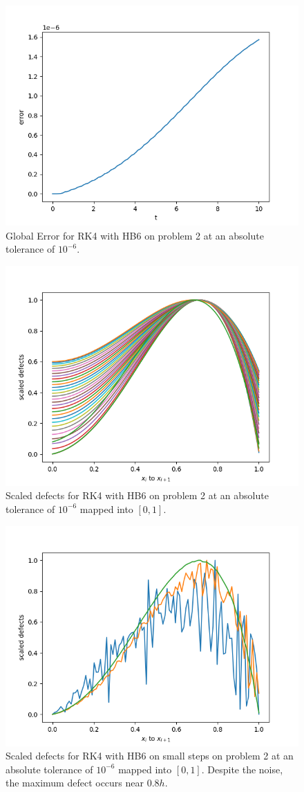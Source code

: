 \begin{figure}[H]
\centering
\includegraphics[width=0.7\linewidth]{./figures/rk4_with_hb6_p2_global_error}
\caption{Global Error for RK4 with HB6 on problem 2 at an absolute tolerance of $10^{-6}$.}
\label{fig:rk4_with_hb6_p2_global_error}
\end{figure}

\begin{figure}[H]
\centering
\includegraphics[width=0.7\linewidth]{./figures/rk4_with_hb6_p2_scaled_defects}
\caption{Scaled defects for RK4 with HB6 on problem 2 at an absolute tolerance of $10^{-6}$ mapped into $[0, 1]$.}
\label{fig:rk4_with_hb6_p2_scaled_defects}
\end{figure}

\begin{figure}[H]
\centering
\includegraphics[width=0.7\linewidth]{./figures/rk4_with_hb6_p2_scaled_defects_small_steps}
\caption{Scaled defects for RK4 with HB6 on small steps on problem 2 at an absolute tolerance of $10^{-6}$ mapped into $[0, 1]$. Despite the noise, the maximum defect occurs near $0.8h$.}
\label{fig:rk4_with_hb6_p2_scaled_defects_small_steps}
\end{figure}

